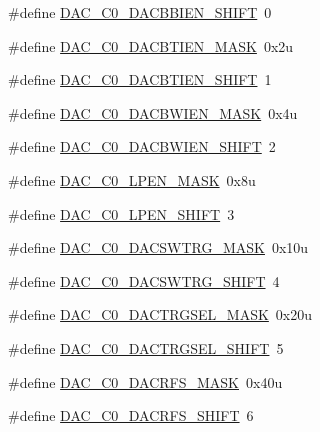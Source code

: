 \begin{DoxyCompactItemize}
\#define \hyperlink{group___d_a_c___register___masks_ga956aa991114a1bb71a891e66d7092d1e}{D\+A\+C\+\_\+\+C0\+\_\+\+D\+A\+C\+B\+B\+I\+E\+N\+\_\+\+S\+H\+I\+FT}~0
\item 
\#define \hyperlink{group___d_a_c___register___masks_gad8a60a2fa6211ff08bba4b9648fb8daa}{D\+A\+C\+\_\+\+C0\+\_\+\+D\+A\+C\+B\+T\+I\+E\+N\+\_\+\+M\+A\+SK}~0x2u
\item 
\#define \hyperlink{group___d_a_c___register___masks_ga1f8eb9a96341365badba1280bed49e05}{D\+A\+C\+\_\+\+C0\+\_\+\+D\+A\+C\+B\+T\+I\+E\+N\+\_\+\+S\+H\+I\+FT}~1
\item 
\#define \hyperlink{group___d_a_c___register___masks_gaedff72359a12b93e4b61a57a0613d3cb}{D\+A\+C\+\_\+\+C0\+\_\+\+D\+A\+C\+B\+W\+I\+E\+N\+\_\+\+M\+A\+SK}~0x4u
\item 
\#define \hyperlink{group___d_a_c___register___masks_ga2b61f6fc85e9dc9d7c736055b47fadd1}{D\+A\+C\+\_\+\+C0\+\_\+\+D\+A\+C\+B\+W\+I\+E\+N\+\_\+\+S\+H\+I\+FT}~2
\item 
\#define \hyperlink{group___d_a_c___register___masks_ga54a04b9ae84c5a4f8977ae2e1a889717}{D\+A\+C\+\_\+\+C0\+\_\+\+L\+P\+E\+N\+\_\+\+M\+A\+SK}~0x8u
\item 
\#define \hyperlink{group___d_a_c___register___masks_ga97aaa812a3938df3559cb40b893db431}{D\+A\+C\+\_\+\+C0\+\_\+\+L\+P\+E\+N\+\_\+\+S\+H\+I\+FT}~3
\item 
\#define \hyperlink{group___d_a_c___register___masks_ga7e785d90fec3c1817fc53fea41f41644}{D\+A\+C\+\_\+\+C0\+\_\+\+D\+A\+C\+S\+W\+T\+R\+G\+\_\+\+M\+A\+SK}~0x10u
\item 
\#define \hyperlink{group___d_a_c___register___masks_ga25e2afd71ee5cc41adde6f072c9d2604}{D\+A\+C\+\_\+\+C0\+\_\+\+D\+A\+C\+S\+W\+T\+R\+G\+\_\+\+S\+H\+I\+FT}~4
\item 
\#define \hyperlink{group___d_a_c___register___masks_gac6dd81bc6500fc4b972c62bde339f31d}{D\+A\+C\+\_\+\+C0\+\_\+\+D\+A\+C\+T\+R\+G\+S\+E\+L\+\_\+\+M\+A\+SK}~0x20u
\item 
\#define \hyperlink{group___d_a_c___register___masks_ga32f43711fa193364231213bd67c989f4}{D\+A\+C\+\_\+\+C0\+\_\+\+D\+A\+C\+T\+R\+G\+S\+E\+L\+\_\+\+S\+H\+I\+FT}~5
\item 
\#define \hyperlink{group___d_a_c___register___masks_gadc1973eafb50599b83de95422477a1f5}{D\+A\+C\+\_\+\+C0\+\_\+\+D\+A\+C\+R\+F\+S\+\_\+\+M\+A\+SK}~0x40u
\item 
\#define \hyperlink{group___d_a_c___register___masks_ga495d0702c9899844340d198120a77e33}{D\+A\+C\+\_\+\+C0\+\_\+\+D\+A\+C\+R\+F\+S\+\_\+\+S\+H\+I\+FT}~6

\end{DoxyCompactItemize}
